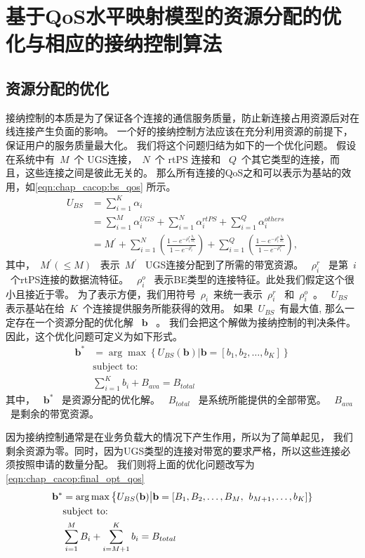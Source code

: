 \section{基于QoS水平映射模型的资源分配的优化与相应的接纳控制算法}
\subsection{资源分配的优化}
接纳控制的本质是为了保证各个连接的通信服务质量，防止新连接占用资源后对在线连接产生负面的影响。
一个好的接纳控制方法应该在充分利用资源的前提下，保证用户的服务质量最大化。
我们将这个问题归结为如下的一个优化问题。
假设在系统中有~$M$~个 UGS连接，~$N$~个 rtPS 连接和 ~$Q$~个其它类型的连接，而且，这些连接之间是彼此无关的。
那么所有连接的QoS之和可以表示为基站的效用，如\eqref{eqn:chap_cacop:bs_qos} 所示。
\begin{align}
U_{BS} &= \displaystyle \sum_{i=1}^K \alpha_i \nonumber \\
&= \sum_{i=1}^M\alpha_i^{UGS} + \sum_{i=1}^N\alpha_i^{rtPS} + \sum_{i=1}^Q\alpha_i^{others} \nonumber \\
&=\displaystyle M^\prime + \sum_{i=1}^N \left( \frac{1- e^{-\rho_i^r
\frac{b_i}{B_i} }}{1-e^{-\rho_i^r}} \right)
 + \sum_{i=1}^Q \left( \frac{1- e^{-\rho_i^o
\frac{b_i}{B_i} }}{1-e^{-\rho_i^o}} \right),
\label{eqn:chap_cacop:bs_qos}
\end{align}
其中，~$M^\prime(\le M)$~ 表示~$M^\prime$~ UGS连接分配到了所需的带宽资源。
~$\rho_i^r$~ 是第~$i$~个rtPS连接的数据流特征。 
~$\rho_i^o$~ 表示BE类型的连接特征。此处我们假定这个很小且接近于零。
为了表示方便，我们用符号~$\rho_i$~来统一表示~$\rho_i^r$~ 和~$\rho_i^o$~。
~$U_{BS}$~ 表示基站在给~$K$~个连接提供服务所能获得的效用。
如果~$U_{BS}$~有最大值, 那么一定存在一个资源分配的优化解
~$\mathbf{b}$~ 。
我们会把这个解做为接纳控制的判决条件。
因此，这个优化问题可定义为如下形式。
\begin{align}
\mathbf{b}^* &= \arg \max \left\{ U_{BS}(\mathbf{b}) \big| \mathbf{b} = [b_1, b_2, \dots, b_K] \right\} \label{eqn_u_bs_qos}\\
&\text{subject to:}\nonumber\\
&\displaystyle\sum_{i=1}^{K}b_i + B_{ava}= B_{total} \nonumber
\end{align}
其中， ~$\mathbf{b}^*$~ 是资源分配的优化解。
~$B_{total}$~ 是系统所能提供的全部带宽。
~$ B_{ava} $~是剩余的带宽资源。

因为接纳控制通常是在业务负载大的情况下产生作用，所以为了简单起见，
我们剩余资源为零。同时，因为UGS类型的连接对带宽的要求严格，所以这些连接必须按照申请的数量分配。
我们则将上面的优化问题改写为 \eqref{eqn:chap_cacop:final_opt_qos}
\begin{align}{}
\label{eqn:chap_cacop:final_opt_qos}
\mathbf{b}^* &= \arg \max \left\{ U_{BS}(\mathbf{b}) \big| \mathbf{b} = [B_1, B_2, \dots,B_M,\right.
 \left. b_{M+1}, \ldots, b_K] \right\} \\
&\text{subject to:}\notag \\
&\sum_{i=1}^M B_i + \sum_{i=M+1}^{K}b_i= B_{total} \notag
\end{align}

